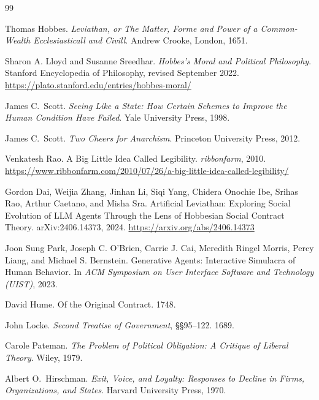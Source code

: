 \documentclass[11pt,a4paper]{article}
\theoremstyle{definition}
\theoremstyle{plain}
\begin{document}

\pdprintsolutions
\begin{thebibliography}{99}

Thomas Hobbes.
\newblock \textit{Leviathan, or The Matter, Forme and Power of a Common-Wealth Ecclesiasticall and Civill}.
\newblock Andrew Crooke, London, 1651.

Sharon A. Lloyd and Susanne Sreedhar.
\newblock \textit{Hobbes's Moral and Political Philosophy}.
\newblock Stanford Encyclopedia of Philosophy, revised September 2022.
\newblock \url{https://plato.stanford.edu/entries/hobbes-moral/}

James C.\ Scott.
\newblock \textit{Seeing Like a State: How Certain Schemes to Improve the Human Condition Have Failed}. Yale University Press, 1998.

James C.\ Scott.
\newblock \textit{Two Cheers for Anarchism}. Princeton University Press, 2012.

Venkatesh Rao.
\newblock A Big Little Idea Called Legibility. \textit{ribbonfarm}, 2010.
\newblock \url{https://www.ribbonfarm.com/2010/07/26/a-big-little-idea-called-legibility/}

Gordon Dai, Weijia Zhang, Jinhan Li, Siqi Yang, Chidera Onochie Ibe, Srihas Rao, Arthur Caetano, and Misha Sra.
\newblock Artificial Leviathan: Exploring Social Evolution of LLM Agents Through the Lens of Hobbesian Social Contract Theory.
\newblock arXiv:2406.14373, 2024. \url{https://arxiv.org/abs/2406.14373}

Joon Sung Park, Joseph C. O'Brien, Carrie J. Cai, Meredith Ringel Morris, Percy Liang, and Michael S. Bernstein.
\newblock Generative Agents: Interactive Simulacra of Human Behavior.
\newblock In \textit{ACM Symposium on User Interface Software and Technology (UIST)}, 2023.

David Hume.
\newblock Of the Original Contract. 1748.

John Locke.
\newblock \textit{Second Treatise of Government}, \S\S95--122. 1689.

Carole Pateman.
\newblock \textit{The Problem of Political Obligation: A Critique of Liberal Theory}. Wiley, 1979.

Albert O.\ Hirschman.
\newblock \textit{Exit, Voice, and Loyalty: Responses to Decline in Firms, Organizations, and States}. Harvard University Press, 1970.


\end{thebibliography}
\end{document}

